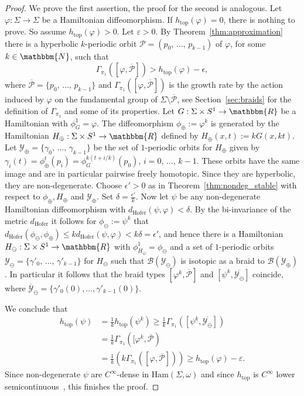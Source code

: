 \documentclass[AHL,Unicode,longabstracts,published]{cedram}
\newcommand{\N}{\mathbbm{N}}
\newcommand{\R}{\mathbbm{R}}
\newcommand{\Ham}{\mathrm{Ham}}
\newcommand{\topo}{\mathrm{top}}
\newcommand{\hofer}{\mathrm{Hofer}}
\newcommand{\clP}{\mathcal{P}}
\newcommand{\clY}{\mathcal{Y}}
\newcommand{\clB}{\mathcal{B}}
\newcommand{\topo}{\mathrm{top}}
\newcommand{\hofer}{\mathrm{Hofer}}
\begin{document}
\begin{proof}
We prove the first assertion, the proof for the second is analogous. Let $\varphi:\Sigma \to \Sigma$ be a Hamiltonian diffeomorphism. If $h_{\topo}(\varphi) = 0$, there is nothing to prove. So assume $h_{\topo}(\varphi) >0$. Let $\varepsilon>0$.
By Theorem~\ref{thm:approximation} there is a hyperbolic $k$-periodic orbit $\clP = (p_0, \,\ldots,\, p_{k-1})$ of $\varphi$, for some $k\in \N$, such that
\[
\Gamma_{\pi_1}\left([\varphi, \overline{\clP}]\right)>h_{\topo}(\varphi)-\epsilon,
\]
where $\overline{\clP} = \{p_0,\,\ldots,\, p_{k-1}\}$ and $\Gamma_{\pi_1}([\varphi, \overline{\clP}])$ is the growth rate by the action induced by $\varphi$ on the fundamental group of $\Sigma \setminus \overline{\clP}$, see Section~\ref{sec:braids} for the definition of $\Gamma_{\pi_1}$ and some of its properties.
Let $G:\Sigma \times S^1\to \R$ be a Hamiltonian with $\phi^1_G = \varphi$. The diffeomorphism $\phi_{\oplus}:=\varphi^k$ is generated by the Hamiltonian $H_{\oplus}:\Sigma \times S^1 \to \R$ defined by $H_{\oplus}(x,t) := kG(x,kt)$. Let $\clY_{\oplus} = \{\gamma_0,\, \ldots,\, \gamma_{k-1}\}$ be the set of $1$-periodic orbits for $H_{\oplus}$ given by $\gamma_i(t) = \phi^t_{\oplus}(p_i) = \phi^{k(t+i/k)}_G(p_0)$, $i=0, \,\ldots,\, k-1$. These orbits have the same image and are in particular pairwise freely homotopic. Since they are hyperbolic, they are non-degenerate. Choose $\epsilon'>0$ as in Theorem~\ref{thm:nondeg_stable} with respect to $\phi_{\oplus}, H_{\oplus}$ and $\clY_{\oplus}$. Set $\delta = \frac{\epsilon'}{k}$. Now let $\psi$ be any non-degenerate Hamiltonian diffeomorphism with $d_{\hofer}(\psi, \varphi) < \delta$. By the bi-invariance of the metric $d_{\hofer}$ it follows for $\phi_{\ominus} :=\psi^k$ that $d_{\hofer}(\phi_{\ominus}, \phi_{\oplus}) \leq k d_{\hofer}(\psi,\varphi) < k\delta =\epsilon'$, and hence there is a Hamiltonian $H_{\ominus}:\Sigma \times S^1 \to \R$ with $\phi^1_{H_{\ominus}} = \phi_{\ominus}$ and a set of $1$-periodic orbits $\clY_{\ominus}= \{\gamma'_0, \,\ldots,\, \gamma'_{k-1}\}$ for $H_{\ominus}$ such that $\clB(\clY_{\ominus})$ is isotopic as a braid to $\clB(\clY_{\oplus})$. In particular it follows that the braid types $[\varphi^k,\overline{\clP}]$ and $[\psi^k, \overline{\clY_{\ominus}}]$ coincide, where $\overline{\clY}_{\ominus} = \{\gamma'_0(0), \ldots, \gamma'_{k-1}(0)\}$.

We conclude that
\begin{align*}
h_{\topo}(\psi) &= \frac{1}{k}h_{\topo}(\psi^k) \geq \frac{1}{k} \Gamma_{\pi_1}\left([\psi^k, \overline{\clY_\ominus}]\right) \\
&= \frac{1}{k}\Gamma_{\pi_1}\left([\varphi^k, \overline{\clP}\right)\\
&= \frac{1}{k}\left(k\Gamma_{\pi_1}\left([\varphi, \overline{\clP}]\right)\right)  \geq h_{\topo}(\varphi)-\varepsilon.
\end{align*}
Since non-degenerate $\psi$ are $C^{\infty}$-dense in $\Ham(\Sigma, \omega)$ and since $h_{\topo}$ is $C^{\infty}$ lower semicontinuous~\cite{Newhouse}, this finishes the proof.
\end{proof}
\end{document}
